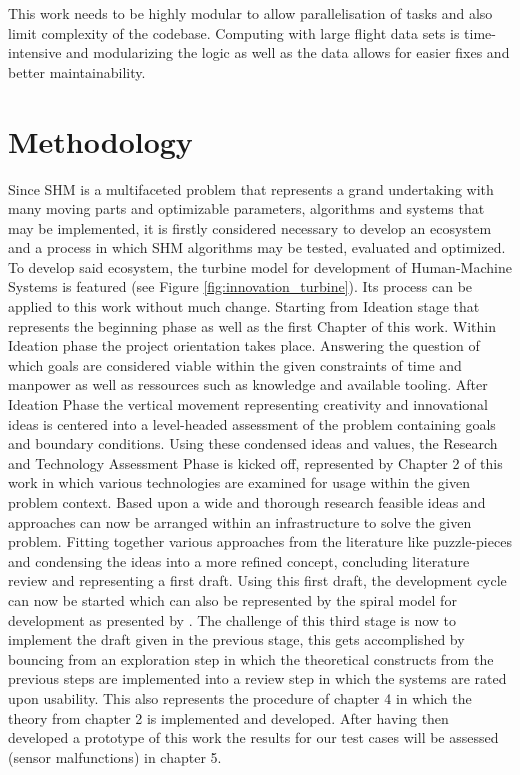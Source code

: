 This work needs to be highly modular to allow parallelisation of tasks and also limit complexity of the codebase. Computing with large flight data sets is time-intensive and modularizing the logic as well as the data allows for easier fixes and better maintainability.

\section{Methodology}

Since SHM is a multifaceted problem that represents a grand undertaking with many moving parts and optimizable parameters, algorithms and systems that may be implemented, it is firstly considered necessary to develop an ecosystem and a process in which SHM algorithms may be tested, evaluated and optimized. To develop said ecosystem, the turbine model for development of Human-Machine Systems is featured (see Figure \ref{fig:innovation_turbine}). Its process can be applied to this work without much change. Starting from Ideation stage that represents the beginning phase as well as the first Chapter of this work. Within Ideation phase the project orientation takes place. Answering the question of which goals are considered viable within the given constraints of time and manpower as well as ressources such as knowledge and available tooling.
After Ideation Phase the vertical movement representing creativity and innovational ideas is centered into a level-headed assessment of the problem containing goals and boundary conditions. Using these condensed ideas and values, the Research and Technology Assessment Phase is kicked off, represented by Chapter 2 of this work in which various technologies are examined for usage within the given problem context. Based upon a wide and thorough research feasible ideas and approaches can now be arranged within an infrastructure to solve the given problem. Fitting together various approaches from the literature like puzzle-pieces and condensing the ideas into a more refined concept, concluding literature review and representing a first draft. Using this first draft, the development cycle can now be started which can also be represented by the spiral model for development as presented by \textcite{boehm_spiral_1986}. The challenge of this third stage is now to implement the draft given in the previous stage, this gets accomplished by bouncing from an exploration step in which the theoretical constructs from the previous steps are implemented into a review step in which the systems are rated upon usability. This also represents the procedure of chapter 4 in which the theory from chapter 2 is implemented and developed. After having then developed a prototype of this work the results for our test cases will be assessed (sensor malfunctions) in chapter 5.




